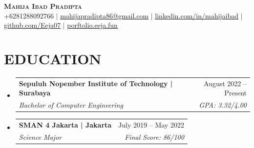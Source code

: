 \documentclass[letterpaper,11pt]{article}
\makeatletter
\newcommand{\resumeSubheading}[4]{
	\vspace{-2pt}\item
	\begin{tabular*}{0.97\textwidth}[t]{l@{\extracolsep{\fill}}r}
		\textbf{#1} & #2 \\
		\textit{\small#3} & \textit{\small #4} \\
	\end{tabular*}\vspace{-7pt}
}
\newcommand{\resumeSubHeadingListStart}{\begin{itemize}[leftmargin=0.15in, label={}]}
\newcommand{\resumeSubHeadingListEnd}{\end{itemize}}
\makeatother
\begin{document}
	
	
	\begin{center}
		\textbf{\Huge \scshape Mahija Ibad Pradipta} \\ \vspace{1pt}
		\small +6281288092766 $|$ \href{mailto:mahijapradipta86@gmail.com}{\underline{mahijapradipta86@gmail.com}} $|$ 
		\href{https://linkedin.com/in/mahijaibad}{\underline{linkedin.com/in/mahijaibad}} $|$
		\href{https://github.com/Eeja07}{\underline{github.com/Eeja07}} $|$
		\href{https://portfolio.eeja.fun}{\underline{porftolio.eeja.fun}}
	\end{center}
	
	
	\section{EDUCATION}
	\resumeSubHeadingListStart
	\resumeSubheading
	{Sepuluh Nopember Institute of Technology | Surabaya}{August 2022 – Present}
	{Bachelor of Computer Engineering}{GPA: 3.32/4.00}
	
	\resumeSubheading
	{SMAN 4 Jakarta | Jakarta}{July 2019 – May 2022}
	{Science Major}{Final Score: 86/100}
	
	\resumeSubHeadingListEnd
	
\end{document}
